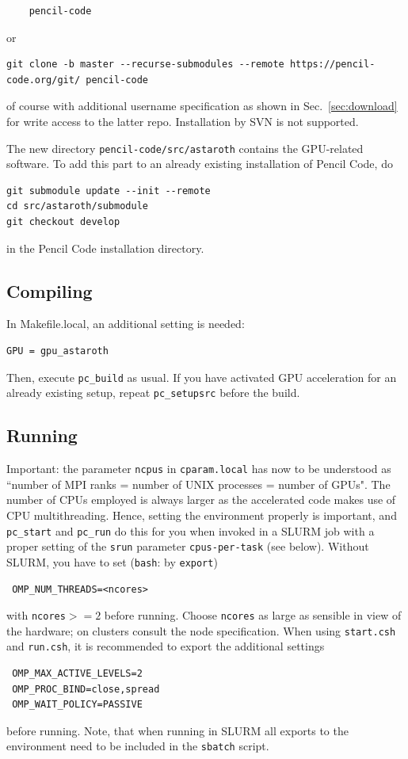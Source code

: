 \documentclass[a4paper,12pt]{article}
\newcommand{\command}[1]{\texttt{#1}}
\newcommand{\code}[1]{\texttt{#1}}
\begin{document}
\vspace{-2mm}
\begin{verbatim}
    pencil-code
\end{verbatim}
or
\begin{verbatim}
git clone -b master --recurse-submodules --remote https://pencil-code.org/git/ pencil-code
\end{verbatim}
of course with additional username specification as shown in Sec.~\ref{sec:download} for write access to the latter repo.
Installation by SVN is not supported.

The new directory
\code{pencil-code/src/astaroth} contains the GPU-related software.
To add this part to an already existing installation of Pencil Code, do
\begin{verbatim}
git submodule update --init --remote
cd src/astaroth/submodule
git checkout develop
\end{verbatim}
in the Pencil Code installation directory.

\subsection{Compiling}
In Makefile.local,  an additional setting is needed:
\begin{verbatim}
GPU = gpu_astaroth
\end{verbatim}

Then, execute \command{pc\_build} as usual.
If you have activated GPU acceleration for an already existing setup, repeat \command{pc\_setupsrc} before the build.

\subsection{Running}
Important: the parameter \command{ncpus} in \command{cparam.local} has now to be understood as ``number of MPI ranks = number of UNIX processes = number of GPUs". The number of CPUs employed is always larger  as
the accelerated code makes use of CPU multithreading. Hence, setting the environment properly is important, and \command{pc_start} and \command{pc_run} do this for you when invoked in a SLURM job with a proper setting of the \code{srun} parameter \code{cpus-per-task} (see below). Without SLURM, you have to set
(\code{bash}: by \command{export})
\begin{verbatim}
 OMP_NUM_THREADS=<ncores>
\end{verbatim}
with \command{ncores}$ >=2$ before running.
Choose \command{ncores} as large as sensible in view of the hardware; on clusters consult the node specification.
When using \command{start.csh} and \command{run.csh}, it is recommended to export the additional settings
\begin{verbatim}
 OMP_MAX_ACTIVE_LEVELS=2
 OMP_PROC_BIND=close,spread
 OMP_WAIT_POLICY=PASSIVE
\end{verbatim}
before running.
Note, that when running in SLURM
all exports to the environment need to be included in the \code{sbatch} script.
\end{document}
